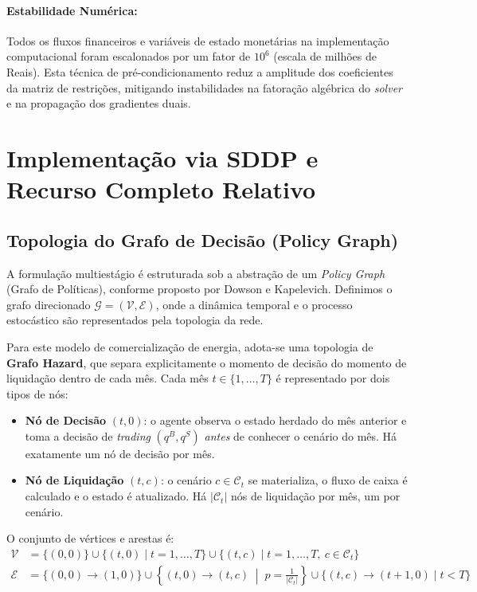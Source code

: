 \documentclass[12pt, a4paper]{article}
\begin{document}
\paragraph{Estabilidade Numérica:} Todos os fluxos financeiros e variáveis de estado monetárias na implementação computacional foram escalonados por um fator de $10^6$ (escala de milhões de Reais). Esta técnica de pré-condicionamento reduz a amplitude dos coeficientes da matriz de restrições, mitigando instabilidades na fatoração algébrica do \textit{solver} e na propagação dos gradientes duais.

\section{Implementação via SDDP e Recurso Completo Relativo}

\subsection{Topologia do Grafo de Decisão (Policy Graph)}

A formulação multiestágio é estruturada sob a abstração de um \textit{Policy Graph} (Grafo de Políticas), conforme proposto por Dowson e Kapelevich. Definimos o grafo direcionado $\mathcal{G} = (\mathcal{V}, \mathcal{E})$, onde a dinâmica temporal e o processo estocástico são representados pela topologia da rede.

Para este modelo de comercialização de energia, adota-se uma topologia de \textbf{Grafo Hazard}, que separa explicitamente o momento de decisão do momento de liquidação dentro de cada mês. Cada mês $t \in \{1, \dots, T\}$ é representado por dois tipos de nós:

\begin{itemize}
    \item \textbf{Nó de Decisão} $(t, 0)$: o agente observa o estado herdado do mês anterior e toma a decisão de \textit{trading} $(q^B, q^S)$ \emph{antes} de conhecer o cenário do mês. Há exatamente um nó de decisão por mês.
    \item \textbf{Nó de Liquidação} $(t, c)$: o cenário $c \in \mathcal{C}_t$ se materializa, o fluxo de caixa é calculado e o estado é atualizado. Há $|\mathcal{C}_t|$ nós de liquidação por mês, um por cenário.
\end{itemize}

O conjunto de vértices e arestas é:
\begin{align}
    \mathcal{V} &= \{(0,0)\} \cup \{(t, 0) \mid t = 1,\dots,T\} \cup \{(t, c) \mid t = 1,\dots,T,\ c \in \mathcal{C}_t\} \\
    \mathcal{E} &= \{(0,0) \to (1,0)\}
        \cup \left\{(t,0) \to (t,c) \;\middle|\; p = \frac{1}{|\mathcal{C}_t|}\right\}
        \cup \{(t,c) \to (t+1,0) \mid t < T\}
\end{align}
\end{document}
